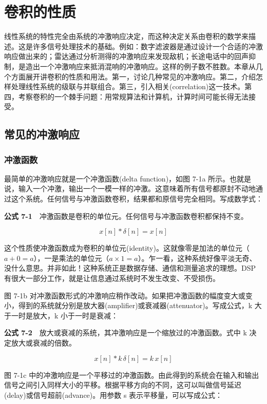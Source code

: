 
\chapter{卷积的性质}\label{ch-07}

线性系统的特性完全由系统的冲激响应决定，而这种决定关系由卷积的数学来描述。这是许多信号处理技术的基础。例如：数字滤波器是通过设计一个合适的冲激响应做出来的；雷达通过分析测得的冲激响应来发现敌机；长途电话中的回声抑制，是造出一个冲激响应来抵消混响的冲激响应。这样的例子数不胜数。本章从几个方面展开讲卷积的性质和用法。第一，讨论几种常见的冲激响应。第二，介绍怎样处理线性系统的级联与并联组合。第三，引入相关(correlation)这一技术。第四，考察卷积的一个棘手问题：用常规算法和计算机，计算时间可能长得无法接受。

\section{常见的冲激响应}

\subsection{冲激函数}

最简单的冲激响应就是一个冲激函数(delta function)，如图 7-1a
所示。也就是说，输入一个冲激，输出一个一模一样的冲激。这意味着所有信号都原封不动地通过这个系统。任何信号与冲激函数卷积，结果都和原信号完全相同。写成数学式：

\textbf{公式
7-1}　冲激函数是卷积的单位元。任何信号与冲激函数卷积都保持不变。

\[x[n] * \delta[n] = x[n]\]

这个性质使冲激函数成为卷积的单位元(identity)。这就像零是加法的单位元（\(a + 0 = a\)），一是乘法的单位元（\(a \times 1 = a\)）。乍一看，这种系统好像平淡无奇、没什么意思。并非如此！这种系统正是数据存储、通信和测量追求的理想。DSP
有很大一部分工作，就是让信息通过系统时不发生改变、不受损伤。

图 7-1b
对冲激函数形式的冲激响应稍作改动。如果把冲激函数的幅度变大或变小，得到的系统就分别是放大器(amplifier)或衰减器(attenuator)。写成公式，k
大于一时是放大，k 小于一时是衰减：

\textbf{公式
7-2}　放大或衰减的系统，其冲激响应是一个缩放过的冲激函数。式中 k
决定放大或衰减的倍数。

\[x[n] * k\,\delta[n] = k\,x[n]\]

图 7-1c
中的冲激响应是一个平移过的冲激函数。由此得到的系统会在输入和输出信号之间引入同样大小的平移。根据平移方向的不同，这可以叫做信号延迟(delay)或信号超前(advance)。用参数
s 表示平移量，可以写成公式：

